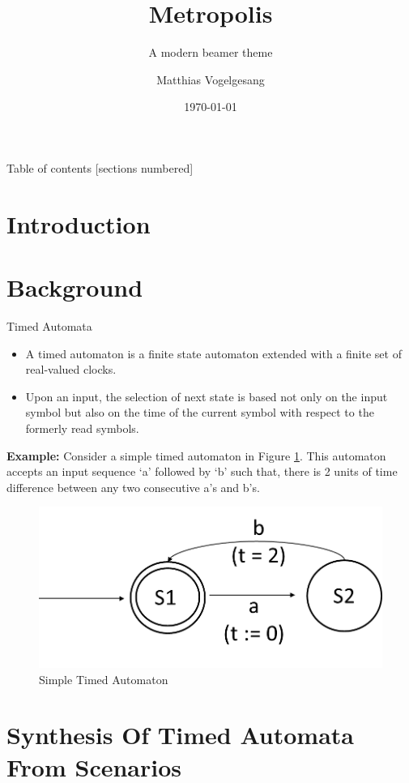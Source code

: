 \documentclass[10pt]{beamer}
\title{Metropolis}
\subtitle{A modern beamer theme}
\date{\today}
\author{Matthias Vogelgesang}
\institute{Center for modern beamer themes}
\theoremstyle{plain}
\theoremstyle{definition}
\begin{document}
\maketitle

\begin{frame}{Table of contents}
  [sections numbered]
  \tableofcontents[hideallsubsections]
\end{frame}

\section{Introduction}

\section{Background}

\begin{frame}{Timed Automata}
	\begin{itemize}
		\item A timed automaton \cite{Alur:1994:TTA:180782.180519} is a finite state automaton extended with a finite set of real-valued clocks. 
		\item Upon an input, the selection of next state is based not only on the input symbol but also on the time of the current symbol with respect to the formerly read symbols. 
	\end{itemize}
	
	\textbf{Example:} Consider a simple timed automaton in Figure \ref{fig:fig1}. This automaton accepts an input sequence `a' followed by `b' such that, there is 2 units of time difference between any two consecutive a's and b's.
	 
	 \begin{figure}
	 	\centering
	 	\includegraphics[width=0.5\linewidth]{"fig1"}
	 	\caption{Simple Timed Automaton}
	 	\label{fig:fig1}
	 \end{figure}
\end{frame}

\section{Synthesis Of Timed Automata From Scenarios}
\end{document}
